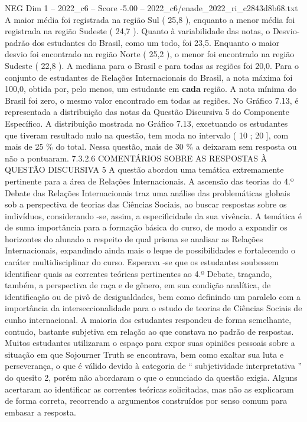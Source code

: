\begin{textsample}{NEG Dim 1 – 2022\_c6 – Score -5.00 – 2022\_c6/enade\_2022\_ri\_c2843d8b68.txt}
A maior média foi registrada na região Sul ( 25,8 ), enquanto a menor média foi registrada na região Sudeste ( 24,7 ).
Quanto à variabilidade das notas, o Desvio-padrão dos estudantes do Brasil, como um todo, foi 23,5.
Enquanto o maior desvio foi encontrado na região Norte ( 25,2 ), o menor foi encontrado na região Sudeste ( 22,8 ).
A mediana para o Brasil e para todas as regiões foi 20,0.
Para o conjunto de estudantes de Relações Internacionais do Brasil, a nota máxima foi 100,0, obtida por, pelo menos, um estudante em \textbf{cada} região.
A nota mínima do Brasil foi zero, o mesmo valor encontrado em todas as regiões.
No Gráfico 7.13, é representada a distribuição das notas da Questão Discursiva 5 do Componente Específico.
A distribuição mostrada no Gráfico 7.13, excetuando os estudantes que tiveram resultado nulo na questão, tem moda no intervalo ( 10 ; 20 ], com mais de 25 \% do total.
Nessa questão, mais de 30 \% a deixaram sem resposta ou não a pontuaram. 7.3.2.6 COMENTÁRIOS SOBRE AS RESPOSTAS À QUESTÃO DISCURSIVA 5 A questão abordou uma temática extremamente pertinente para a área de Relações Internacionais.
A ascensão das teorias do 4.º Debate das Relações Internacionais traz uma análise das problemáticas globais sob a perspectiva de teorias das Ciências Sociais, ao buscar respostas sobre os indivíduos, considerando -se, assim, a especificidade da sua vivência.
A temática é de suma importância para a formação básica do curso, de modo a expandir os horizontes do alunado a respeito de qual prisma se analisar as Relações Internacionais, expandindo ainda mais o leque de possibilidades e fortalecendo o caráter multidisciplinar do curso.
Esperava -se que os estudantes soubessem identificar quais as correntes teóricas pertinentes ao 4.º Debate, traçando, também, a perspectiva de raça e de gênero, em sua condição analítica, de identificação ou de pivô de desigualdades, bem como definindo um paralelo com a importância da interseccionalidade para o estudo de teorias de Ciências Sociais de cunho internacional.
A maioria dos estudantes respondeu de forma semelhante, contudo, bastante subjetiva em relação ao que constava no padrão de respostas.
Muitos estudantes utilizaram o espaço para expor suas opiniões pessoais sobre a situação em que Sojourner Truth se encontrava, bem como exaltar sua luta e perseverança, o que é válido devido à categoria de “ subjetividade interpretativa ” do quesito 2, porém não abordaram o que o enunciado da questão exigia.
Alguns acertaram ao identificar as correntes teóricas solicitadas, mas não as explicaram de forma correta, recorrendo a argumentos construídos por senso comum para embasar a resposta.

\end{textsample}
